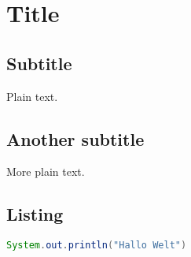 \documentclass{article}
\begin{document}
\section{Title}

\subsection{Subtitle}

Plain text.

\subsection{Another subtitle}

More plain text.

\subsection{Listing}

\begin{lstlisting}[language=Java,frame=shadowbox,rulesepcolor=\color{black}]
	System.out.println("Hallo Welt")
\end{lstlisting}
\end{document}
